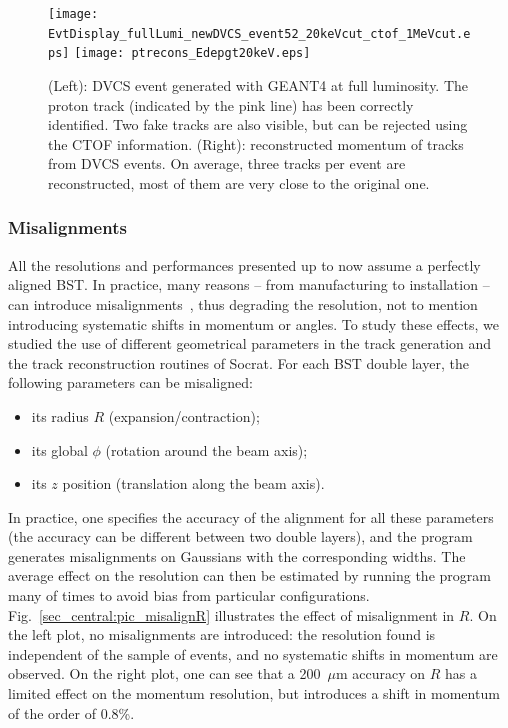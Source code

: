 \begin{figure}[ht!]
\centering
\texttt{[image: EvtDisplay\_fullLumi\_newDVCS\_event52\_20keVcut\_ctof\_1MeVcut.eps]}
\texttt{[image: ptrecons\_Edepgt20keV.eps]}
\caption{\small{(Left): DVCS event generated with GEANT4 at full luminosity.  The 
proton track (indicated by the pink line) has been correctly identified.  Two fake 
tracks are also visible, but can be rejected using the CTOF information. (Right): 
reconstructed momentum of tracks from DVCS events. On average, three tracks per event 
are reconstructed, most of them are very close to the original one.}}
\label{sec_central:pic_dvcs}
\end{figure}

\subsubsection{Misalignments}

All the resolutions and performances presented up to now assume a perfectly aligned 
BST.  In practice, many reasons -- from manufacturing to installation -- can 
introduce misalignments~\cite{2008-009}, thus degrading the resolution, not to 
mention introducing systematic shifts in momentum or angles.  To study these effects, 
we studied the use of different geometrical parameters in the track generation and 
the track reconstruction routines of Socrat.  For each BST double layer, the following 
parameters can be misaligned:

\begin{itemize}
\item its radius $R$ (expansion/contraction);
\item its global $\phi$ (rotation around the beam axis);
\item its $z$ position (translation along the beam axis).
\end{itemize}

In practice, one specifies the accuracy of the alignment for all these parameters 
(the accuracy can be different between two double layers), and the program generates 
misalignments on Gaussians with the corresponding widths.  The average effect on the 
resolution can then be estimated by running the program many of times to avoid bias 
from particular configurations.  Fig.~\ref{sec_central:pic_misalignR} illustrates the 
effect of misalignment in $R$.  On the left plot, no misalignments are introduced: 
the resolution found is independent of the sample of events, and no systematic shifts 
in momentum are observed.  On the right plot, one can see that a 200~$\mu$m accuracy 
on $R$ has a limited effect on the momentum resolution, but introduces a shift in 
momentum of the order of 0.8\%.

